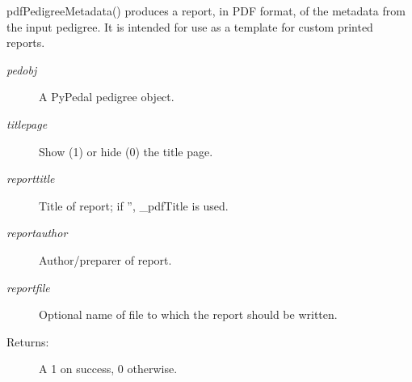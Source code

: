 \begin{description}
 pdfPedigreeMetadata() produces a report, in PDF format, of the metadata from the input pedigree. It is intended for use as a template for custom printed reports.
\begin{description}
\item[\emph{pedobj}
] A PyPedal pedigree object.
\item[\emph{titlepage}
] Show (1) or hide (0) the title page.
\item[\emph{reporttitle}
] Title of report; if '', \_pdfTitle is used.
\item[\emph{reportauthor}
] Author/preparer of report.
\item[\emph{reportfile}
] Optional name of file to which the report should be written.
\item[Returns:] A 1 on success, 0 otherwise.

\end{description}
\\ 


\end{description}

